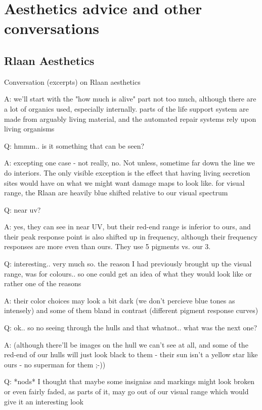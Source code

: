 \label{chapt:uncategorized}
\section{Aesthetics advice and other conversations}
\subsection{Rlaan Aesthetics}
Conversation (excerpts) on Rlaan aesthetics

A: we'll start with the "how much is alive" part not too much,
although there are a lot of organics used, especially internally.
parts of the life support system are made from arguably living
material, and the automated repair systems rely upon living organisms

Q: hmmm.. is it something that can be seen?

A: excepting one case - not really, no. Not unless, sometime far down
the line we do interiors. The only visible exception is the effect
that having living secretion sites would have on what we might want
damage maps to look like. for visual range, the Rlaan are heavily blue
shifted relative to our visual spectrum

Q: near uv?

A: yes, they can see in near UV, but their red-end range is inferior
to ours, and their peak response point is also shifted up in
frequency, although their frequency responses are more even than
ours. They use 5 pigments vs. our 3.

Q: interesting.. very much so. the reason I had previously brought up
the visual range, was for colours.. so one could get an idea of what
they would look like or rather one of the reasons

A: their color choices may look a bit dark (we don't percieve blue
tones as intensely) and some of them bland in contrast (different
pigment response curves)

Q: ok.. so no seeing through the hulls and that whatnot.. what was the
next one?

A: (although there'll be images on the hull we can't see at all, and
some of the red-end of our hulls will just look black to them - their
sun isn't a yellow star like ours - no superman for them ;-))

Q: *nods* I thought that maybe some insignias and markings might look
broken or even fairly faded, as parts of it, may go out of our visual
range which would give it an interesting look

